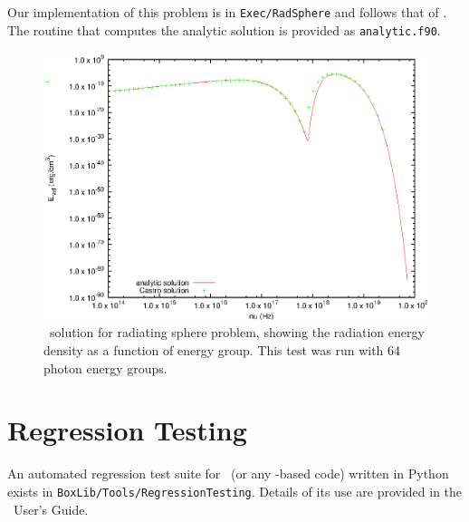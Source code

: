 Our implementation of this problem is in {\tt Exec/RadSphere} and
follows that of \cite{swestymyra:2009}.  The routine that computes
the analytic solution is provided as {\tt analytic.f90}.

\begin{figure}[h]
\centering
\includegraphics[width=5.0in]{CastroVerification/radiating_sphere}
\caption{\label{fig:radsphere} \castro\ solution for radiating sphere problem,
  showing the radiation energy density as a function of energy group.
  This test was run with 64 photon energy groups.}
\end{figure}


\section{Regression Testing}

An automated regression test suite for \castro\ (or any \boxlib-based
code) written in Python exists in {\tt BoxLib/Tools/RegressionTesting}.
Details of its use are provided in the \boxlib\ User's Guide.

